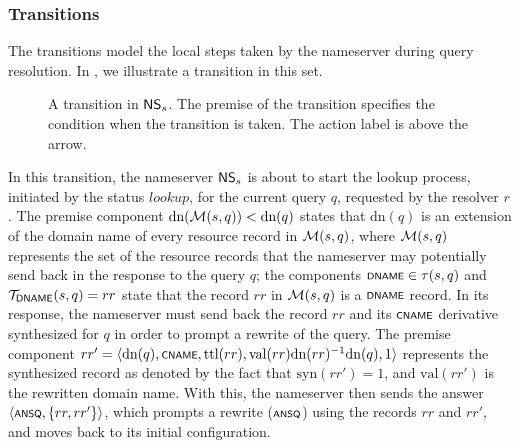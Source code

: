 \subsubsection{Transitions}


The transitions model the local steps taken by the nameserver during query resolution. In , we illustrate a transition in this set.

\begin{figure}[h!]
	\centering
	\captionsetup{skip=5pt}
	\caption{\label{fig:ns-transitions}A transition in $\ns{s}$. The premise of the transition specifies the condition when the transition is taken. The action label is above the arrow.}
\end{figure}

In this transition, the nameserver $\ns{s}$ is about to start the lookup process, initiated by the status $\mathit{lookup}$, for the current query $q$, requested by the resolver $r$. The premise component $\text{dn} (\cal M (s, q)) < \text{dn} (q)$ states that $\text{dn} (q)$ is an extension of the domain name of every resource record in $\cal M (s, q)$, where $\cal M (s, q)$ represents the set of the resource records that the nameserver may potentially send back in the response to the query $q$; the components $\scrsf{dname}\in \tau (s, q)$ and ${\cal T}_{\scrsf{dname}} (s, q) = {rr}$ state that the record $rr$ in $\cal M (s, q)$ is a $\scrsf{dname}$ record. In its response, the nameserver must send back the record $rr$ and its $\scrsf{cname}$ derivative synthesized for $q$ in order to prompt a rewrite of the query. The premise component $rr'=\tup{\text{dn}(q),\scrsf{cname},\text{ttl}(rr),\text{val}(rr)\text{dn}(rr)^{-1} \text{dn}(q),1}$ represents the synthesized record as denoted by the fact that $\text{syn} (rr') = 1$, and $\text{val}(rr')$ is the rewritten domain name. With this, the nameserver then sends the answer $\tup{\scrsf{ansq},\{rr,rr'\}}$, which prompts a rewrite ($\scrsf{ansq}$) using the records $rr$ and $rr'$, and moves back to its initial configuration. 



